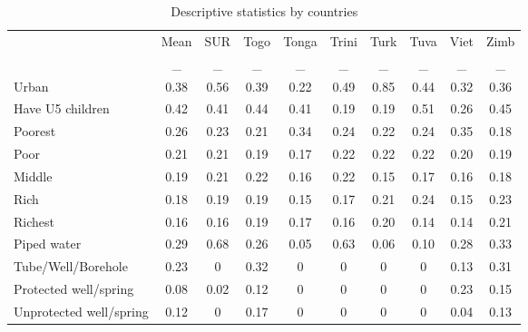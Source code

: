 \begin{table}[htbp]\centering
\def\sym#1{\ifmmode^{#1}\else\(^{#1}\)\fi}
\caption{Descriptive statistics by countries \label{Outside}}
\begin{tabular}{l*{9}{c}}
\hline\hline
                    &\multicolumn{1}{c}{Mean}&\multicolumn{1}{c}{SUR}&\multicolumn{1}{c}{Togo}&\multicolumn{1}{c}{Tonga}&\multicolumn{1}{c}{Trini}&\multicolumn{1}{c}{Turk}&\multicolumn{1}{c}{Tuva}&\multicolumn{1}{c}{Viet}&\multicolumn{1}{c}{Zimb}\\
                    &           _&           _&           _&           _&           _&           _&           _&           _&           _\\
\hline
Urban               &        0.38&        0.56&        0.39&        0.22&        0.49&        0.85&        0.44&        0.32&        0.36\\
Have U5 children    &        0.42&        0.41&        0.44&        0.41&        0.19&        0.19&        0.51&        0.26&        0.45\\
Poorest             &        0.26&        0.23&        0.21&        0.34&        0.24&        0.22&        0.24&        0.35&        0.18\\
Poor                &        0.21&        0.21&        0.19&        0.17&        0.22&        0.22&        0.22&        0.20&        0.19\\
Middle              &        0.19&        0.21&        0.22&        0.16&        0.22&        0.15&        0.17&        0.16&        0.18\\
Rich                &        0.18&        0.19&        0.19&        0.15&        0.17&        0.21&        0.24&        0.15&        0.23\\
Richest             &        0.16&        0.16&        0.19&        0.17&        0.16&        0.20&        0.14&        0.14&        0.21\\
Piped water         &        0.29&        0.68&        0.26&        0.05&        0.63&        0.06&        0.10&        0.28&        0.33\\
Tube/Well/Borehole  &        0.23&        0&        0.32&        0&        0&        0&        0&        0.13&        0.31\\
Protected well/spring&        0.08&        0.02&        0.12&        0&        0&        0&        0&        0.23&        0.15\\
Unprotected well/spring&        0.12&        0&        0.17&        0&        0&        0&        0&        0.04&        0.13\\

\end{tabular}
\end{table}
